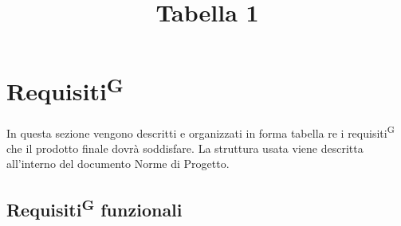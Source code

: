 

\section{Requisiti\textsuperscript{G}}
In questa sezione vengono descritti e organizzati in forma tabella re i requisiti\textsuperscript{G} che il prodotto finale dovrà soddisfare. La struttura usata viene descritta all'interno del documento Norme di Progetto.


\subsection{Requisiti\textsuperscript{G} funzionali}
\title{Tabella 1}
